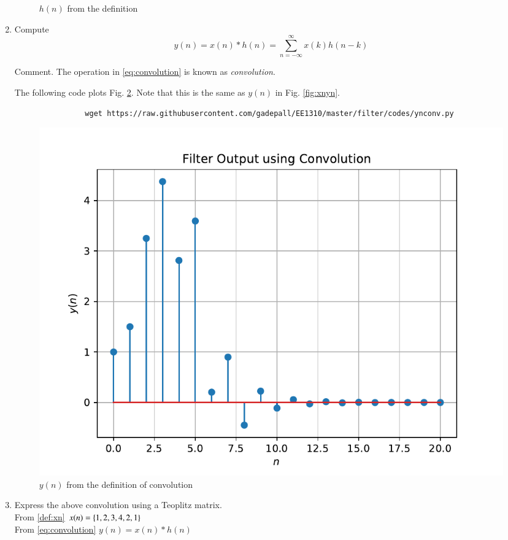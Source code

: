 \documentclass[journal,12pt,twocolumn]{IEEEtran}
\renewcommand\thesection{\arabic{section}}
\begin{document}
\begin{enumerate}[label=\thesection.\arabic*]
\begin{figure}[!ht]
				\caption{$h(n)$ from the definition}
				\label{fig:hndef}
			\end{figure}
			\item Compute 
			\begin{equation}
				\label{eq:convolution}
				y(n) = x(n)*h(n) = \sum_{n=-\infty}^{\infty}x(k)h(n-k)
			\end{equation}
			
			Comment. The operation in \eqref{eq:convolution} is known as
			{\em convolution}.
			
			\solution The following code plots Fig. \ref{fig:ynconv}. Note that this is the same as 
			$y(n)$ in  Fig. 
			\ref{fig:xnyn}. 
			\begin{lstlisting}
				wget https://raw.githubusercontent.com/gadepall/EE1310/master/filter/codes/ynconv.py
			\end{lstlisting}
			\begin{figure}[!ht]
				\centering
				\includegraphics[width=\columnwidth]{./figs/ynconv}
				\caption{\small $y(n)$ from the definition of convolution}
				\label{fig:ynconv}
			\end{figure}
			\vspace{5cm}
			\item Express the above convolution using a Teoplitz matrix.\\
			\solution From \eqref{def:xn}
			$x(n) = \left\{1,2,3,4,2,1\right\}$\\
			From \eqref{eq:convolution}	$y(n) = x(n)*h(n)$\\

\end{enumerate}
\end{document}
